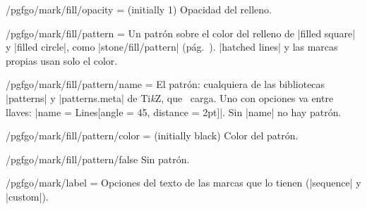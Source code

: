 \begin{key}{/pgfgo/mark/fill/opacity =  (initially 1)}
	Opacidad del relleno.

	\begin{codeexample}[width=4cm]

		\begin{goban}[3]
		\end{goban}
	\end{codeexample}
\end{key}


\begin{key}{/pgfgo/mark/fill/pattern = }
	Un patrón sobre el color del relleno de |filled square| y |filled circle|, como |stone/fill/pattern| (pág.~\pageref{sec:piedras}). |hatched lines| y las marcas propias usan solo el color.

	\begin{codeexample}[width=4cm]
		\begin{goban}[3]
		\end{goban}
	\end{codeexample}
\end{key}

\begin{key}{/pgfgo/mark/fill/pattern/name = }
	El patrón: cualquiera de las bibliotecas |patterns| y |patterns.meta| de Ti\emph{k}Z, que \pgfgoname\ carga. Uno con opciones va entre llaves: |name = {Lines[angle = 45, distance = 2pt]}|. Sin |name| no hay patrón.
\end{key}

\begin{key}{/pgfgo/mark/fill/pattern/color =  (initially black)}
	Color del patrón.
\end{key}

\begin{key}{/pgfgo/mark/fill/pattern/false}
	Sin patrón.
\end{key}


\begin{key}{/pgfgo/mark/label = }
	Opciones del texto de las marcas que lo tienen (|sequence| y |custom|).
\end{key}


